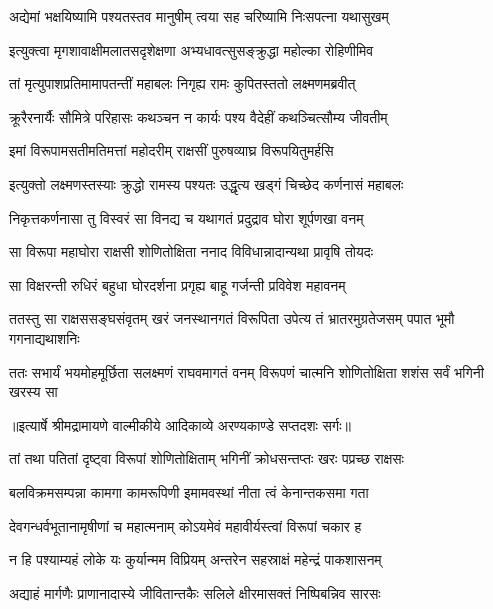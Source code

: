 \twolineshloka
{अद्येमां भक्षयिष्यामि पश्यतस्तव मानुषीम्}
{त्वया सह चरिष्यामि निःसपत्ना यथासुखम्} %

\twolineshloka
{इत्युक्त्वा मृगशावाक्षीमलातसदृशेक्षणा}
{अभ्यधावत्सुसङ्क्रुद्धा महोल्का रोहिणीमिव} %

\twolineshloka
{तां मृत्युपाशप्रतिमामापतन्तीं महाबलः}
{निगृह्य रामः कुपितस्ततो लक्ष्मणमब्रवीत्} %

\twolineshloka
{क्रूरैरनार्यैः सौमित्रे परिहासः कथञ्चन}
{न कार्यः पश्य वैदेहीं कथञ्चित्सौम्य जीवतीम्} %

\twolineshloka
{इमां विरूपामसतीमतिमत्तां महोदरीम्}
{राक्षसीं पुरुषव्याघ्र विरूपयितुमर्हसि} %

\twolineshloka
{इत्युक्तो लक्ष्मणस्तस्याः क्रुद्धो रामस्य पश्यतः}
{उद्धृत्य खड्गं चिच्छेद कर्णनासं महाबलः} %

\twolineshloka
{निकृत्तकर्णनासा तु विस्वरं सा विनद्य च}
{यथागतं प्रदुद्राव घोरा शूर्पणखा वनम्} %

\twolineshloka
{सा विरूपा महाघोरा राक्षसी शोणितोक्षिता}
{ननाद विविधान्नादान्यथा प्रावृषि तोयदः} %

\twolineshloka
{सा विक्षरन्ती रुधिरं बहुधा घोरदर्शना}
{प्रगृह्य बाहू गर्जन्ती प्रविवेश महावनम्} %

\fourlineindentedshloka
{ततस्तु सा राक्षससङ्घसंवृतम्}
{खरं जनस्थानगतं विरूपिता}
{उपेत्य तं भ्रातरमुग्रतेजसम्}
{पपात भूमौ गगनाद्यथाशनिः} %

\fourlineindentedshloka
{ततः सभार्यं भयमोहमूर्छिता}
{सलक्ष्मणं राघवमागतं वनम्}
{विरूपणं चात्मनि शोणितोक्षिता}
{शशंस सर्वं भगिनी खरस्य सा} %


{॥इत्यार्षे श्रीमद्रामायणे वाल्मीकीये आदिकाव्ये अरण्यकाण्डे सप्तदशः सर्गः॥}


\twolineshloka
{तां तथा पतितां दृष्ट्वा विरूपां शोणितोक्षिताम्}
{भगिनीं क्रोधसन्तप्तः खरः पप्रच्छ राक्षसः} %

\twolineshloka
{बलविक्रमसम्पन्ना कामगा कामरूपिणी}
{इमामवस्थां नीता त्वं केनान्तकसमा गता} %

\twolineshloka
{देवगन्धर्वभूतानामृषीणां च महात्मनाम्}
{कोऽयमेवं महावीर्यस्त्वां विरूपां चकार ह} %

\twolineshloka
{न हि पश्याम्यहं लोके यः कुर्यान्मम विप्रियम्}
{अन्तरेन सहस्राक्षं महेन्द्रं पाकशासनम्} %

\twolineshloka
{अद्याहं मार्गणैः प्राणानादास्ये जीवितान्तकैः}
{सलिले क्षीरमासक्तं निष्पिबन्निव सारसः} %

